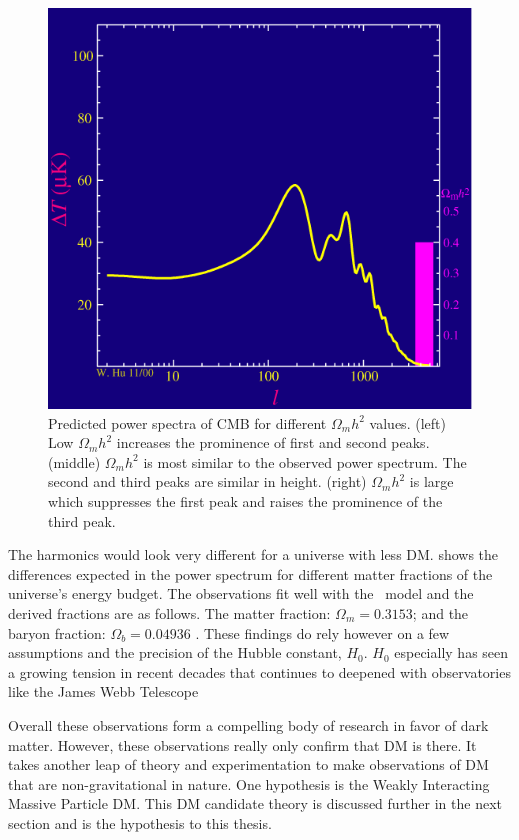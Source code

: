 \begin{figure}[ht]
{        \includegraphics[scale=0.285]{figures/LCDM_multipole/frame_16_delay-0.2s.png}
        \caption{Predicted power spectra of CMB for different $\Omega_m h^2$ values. (left) Low $\Omega_m h^2$ increases the prominence of first and second peaks. (middle) $\Omega_m h^2$ is most similar to the observed power spectrum. The second and third peaks are similar in height. (right) $\Omega_mh^2$ is large which suppresses the first peak and raises the prominence of the third peak.}
        \label{fig:CMB_vibratemodes}
    }
\end{figure}

The harmonics would look very different for a universe with less DM.
 shows the differences expected in the power spectrum for different matter fractions of the universe's energy budget.
The observations fit well with the \lcdm~model and the derived fractions are as follows.
The matter fraction: $\Omega_m = 0.3153$; and the baryon fraction: $\Omega_b = 0.04936$ \cite{Plank:CMB}.
These findings do rely however on a few assumptions and the precision of the Hubble constant, $H_0$.
$H_0$ especially has seen a growing tension in recent decades that continues to deepened with observatories like the James Webb Telescope \cite{JWST:hubble_tension,Freedman:hubble_tension}

Overall these observations form a compelling body of research in favor of dark matter.
However, these observations really only confirm that DM is there.
It takes another leap of theory and experimentation to make observations of DM that are non-gravitational in nature.
One hypothesis is the Weakly Interacting Massive Particle DM.
This DM candidate theory is discussed further in the next section and is the hypothesis to this thesis.

